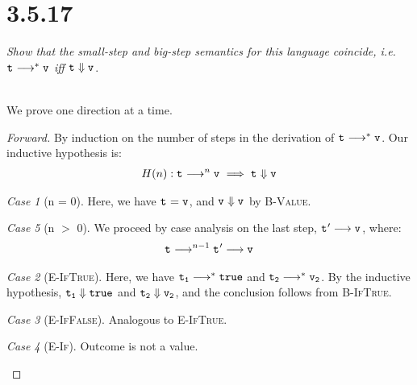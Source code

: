 \documentclass{article}
\newcommand{\term}[1]{\texttt{t\textsubscript{#1}}}
\newcommand{\val}[1]{\texttt{v\textsubscript{#1}}}
\renewcommand{\ss}[2]{#1 \longrightarrow^* #2}
\renewcommand{\bs}[2]{#1 \Downarrow #2}
\newcommand{\ms}[1]{\texttt{#1}}
\theoremstyle{remark}
\newtheorem*{case}{Case}
\begin{document}
\section{3.5.17}

    \textit{Show that the small-step and big-step semantics for this language coincide, i.e.}
    $\term{} \longrightarrow^* \val{}$ \textit{iff} $\term{} \Downarrow \val{}$.

    \noindent \\
    We prove one direction at a time.

    \begin{proof}[Forward]
        By induction on the number of steps in the derivation of $\term{} \longrightarrow^* \val{}$.
        Our inductive hypothesis is:
        \begin{align*}
            H(n): \term{} \longrightarrow^{n} \val{} \implies \bs{\term{}}{\val{}}
        \end{align*}

        \begin{case}[n = 0]
            Here, we have $\term{} = \val{}$, and $\bs{\val{}}{\val{}}$ by \textsc{B-Value}.
        \end{case}

        \begin{case}[n $>$ 0]
            We proceed by case analysis on the last step, $\term{}' \longrightarrow \val{}$, where:
            \begin{align*}
                \term{} \longrightarrow^{n - 1} \term{}' \longrightarrow \val{}
            \end{align*}

            \begin{case}[\textsc{E-IfTrue}]
                Here, we have $\ss{\term{1}}{\ms{true}}$ and $\ss{\term{2}}{\val{2}}$. By the
                inductive hypothesis, $\bs{\term{1}}{\ms{true}}$ and $\bs{\term{2}}{\val{2}}$,
                and the conclusion follows from \textsc{B-IfTrue}.
            \end{case}

            \begin{case}[\textsc{E-IfFalse}]
                Analogous to \textsc{E-IfTrue}.
            \end{case}

            \begin{case}[\textsc{E-If}]
                Outcome is not a value.
            \end{case}


\end{case}
\end{proof}
\end{document}
